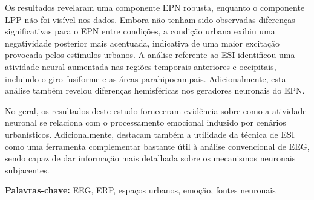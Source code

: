 Os resultados revelaram uma componente EPN robusta, enquanto o componente LPP não foi visível nos dados. Embora não tenham sido observadas diferenças significativas para o EPN entre condições, a condição urbana exibiu uma negatividade posterior mais acentuada, indicativa de uma maior excitação provocada pelos estímulos urbanos. A análise referente ao ESI identificou uma atividade neural aumentada nas regiões temporais anteriores e occipitais, incluindo o giro fusiforme e as áreas parahipocampais. Adicionalmente, esta análise também revelou diferenças hemisféricas nos geradores neuronais do EPN.

No geral, os resultados deste estudo forneceram  evid\^{e}ncia sobre como a atividade neuronal se relaciona com o processamento emocional induzido por cenários urbanísticos. Adicionalmente, destacam também a utilidade da técnica de ESI como uma ferramenta complementar bastante útil à análise convencional de EEG, sendo capaz de dar informação mais detalhada sobre os mecanismos neuronais subjacentes.

\vfill

\textbf{\Large Palavras-chave:} EEG, ERP, espaços urbanos, emoção, fontes neuronais

